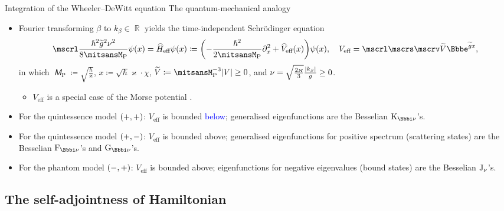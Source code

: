 \documentclass[8pt]{beamer}
\begin{document}
\begin{frame}%
{Integration of the Wheeler--DeWitt equation}%
{The quantum-mechanical analogy}
\begin{itemize}
\item Fourier transforming $\beta$ to $k_\beta \in \BbbR$ yields the
time-independent Schr\"odinger equation
\begin{align}
\mscrl \frac{\hslash^2\widetilde{g}^2\nu^2}{8\mitsansM_\text{P}} \rfun{\psi}{x}
= \widehat{H}_\text{eff} \rfun{\psi}{x} \coloneqq
\rbr{-\frac{\hslash^2}{2 \mitsansM_\text{P}} \partial_x^2
+ \rfun{\widehat{V}_{\text{eff}}}{x}} \rfun{\psi}{x},\quad
V_{\text{eff}} =
\mscrl \mscrs \mscrv \widetilde{V} \ee^{\widetilde{g} x},
\end{align}
in which $\mitsansM_\text{P} \coloneqq \sqrt{\frac{\hslash}{\varkappa}}$,
$x \coloneqq \sqrt{\hslash}\varkappa\cdot\chi$,
$\widetilde{V} \coloneqq \mitsansM_\text{P}^{-3} \vbr{V} \ge 0$, and
$\nu = \sqrt{\frac{2\varkappa}{3}} \frac{{\left|k_\beta\right|}}{g} \ge 0$.
\begin{itemize}
\item $V_{\text{eff}}$ is a special case of the Morse potential%
.
\end{itemize}

\item For the quintessence model ${\left(+, +\right)}$:
$V_{\text{eff}}$ is bounded \textcolor{blue}{below}; generalised
eigenfunctions are the Besselian $\BesselK_{\ii \nu}$'s.

\item For the quintessence model  ${\left(+, -\right)}$:
$V_{\text{eff}}$ is bounded \alert{above}; generalised eigenfunctions 
for positive spectrum (scattering states) are the Besselian
$\BesselF_{\ii \nu}$'s and $\BesselG_{\ii \nu}$'s.

\item For the phantom model ${\left(-, +\right)}$:
$V_{\text{eff}}$ is bounded \alert{above}; eigenfunctions 
for negative eigenvalues (bound states) are the Besselian $\operatorname{J}_{\nu}$'s.
\end{itemize}

\end{frame}

\subsection{The self-adjointness of Hamiltonian}
\end{document}
